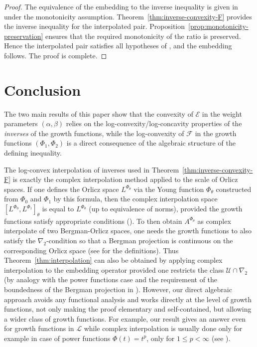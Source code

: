 \documentclass[12pt]{amsart}
\newcommand{\U}{\mathcal{U}}
\newcommand{\Lc}{\mathcal{L}}
\begin{document}
\begin{proof}
The equivalence of the embedding to the inverse inequality is given in \cite{DieSehba2021,DieSehba2023,Sehba} under the monotonicity assumption. Theorem~\ref{thm:inverse-convexity-F} provides the inverse inequality for the interpolated pair. Proposition~\ref{prop:monotonicity-preservation} ensures that the required monotonicity of the ratio is preserved. Hence the interpolated pair satisfies all hypotheses of \cite[Corollary 2.6]{DieSehba2023}, and the embedding follows. The proof is complete.
\end{proof}

\section{Conclusion}
The two main results of this paper show that the convexity of $\mathcal{E}$ in the weight parameters $(\alpha,\beta)$ relies on the log-convexity/log-concavity properties of the \emph{inverses} of the growth functions, while the log-convexity of $\mathcal{F}$ in the growth functions $(\Phi_1,\Phi_2)$ is a direct consequence of the algebraic structure of the defining inequality.

\medskip
The log-convex interpolation of inverses used in Theorem~\ref{thm:inverse-convexity-F} is exactly the complex interpolation method applied to the scale of Orlicz spaces. If one defines the Orlicz space $L^{\Phi_\theta}$ via the Young function $\Phi_\theta$ constructed from $\Phi_0$ and $\Phi_1$ by this formula, then the complex interpolation space $[L^{\Phi_0}, L^{\Phi_1}]_\theta$ is equal to $L^{\Phi_\theta}$ (up to equivalence of norms), provided the growth functions satisfy appropriate conditions (\cite{BerghLofstrom1976,delCampo2014,GustavssonPeetre1977}). To then obtain $A^{\Phi_\theta}$ as complex interpolate of two Bergman-Orlicz spaces, one needs the growth functions to also satisfy  the $\nabla_2$-condition so that a Bergman projection is continuous on the corresponding Orlicz space  (see \cite{DieSehba2021,DieSehba2023} for the definitions). Thus Theorem~\ref{thm:interpolation} can also be obtained by applying complex interpolation to the embedding operator provided one restricts the class $\U\cap\nabla_2$ (by analogy with the power functions case \cite{ZhuZhao} and the requirement of the boundedness of the Bergman projection in \cite{DieSehba2023}). However, our direct algebraic approach avoids any functional analysis and works directly at the level of growth functions, not only making the proof elementary and self-contained, but allowing a wider class of growth functions. For example, our result gives an answer even for growth functions in $\Lc$ while complex interpolation is usually done only for example in case of power functions $\Phi(t)=t^p$, only for $1\le p<\infty$ (see \cite{ZhuZhao}).
\end{document}

